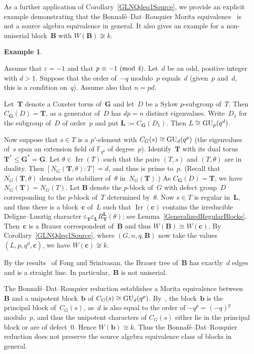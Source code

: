 \documentclass[12pt]{amsart}
\newcommand{\bG}{{\mathbf{G}}}      %
\newcommand{\bB}{{\mathbf{B}}}
\newcommand{\bL}{{\mathbf{L}}}
\newcommand{\bT}{{\mathbf{T}}}
\newcommand{\bb}{{\mathbf{b}}}
\newcommand{\bc}{{\mathbf{c}}}
\def\GU{ \text{\rm GU} }
\DeclareMathOperator{\Irr}{Irr}
\theoremstyle{theorem}
\theoremstyle{definition}
\newtheorem{exmp}[thm]{Example}
\theoremstyle{remark}
\begin{document}
As a further application of Corollary~\ref{GLNQdeq1Source}, we provide an
explicit example demonstrating that the Bonnaf{\'e}--Dat--Rouquier Morita 
equivalence~\cite{BoDaRo} is not a source algebra equivalence in general.
It also gives an example for a non-uniserial block~${\bB}$ with 
$W( {\bB} ) \not\cong k$.
\begin{exmp}
\label{BoDaRoExample}
{\rm
Assume that $\varepsilon = -1$ and that $p \equiv -1\,\,(\mbox{\rm mod}\,\,4)$.
Let~$d$ be an odd, positive integer with $d > 1$. Suppose that the order of~$-q$ 
modulo~$p$ equals~$d$ (given~$p$ and~$d$, this is a condition on~$q$). Assume 
also that $n = pd$.

Let~${\bT}$ denote a Coxeter torus of~${\bG}$ and let~${D}$ be a Sylow 
$p$-subgroup of~${T}$. Then $C_{{\bG}}( {D} ) = {\bT}$, as a generator of~$D$ 
has $dp = n$ distinct eigenvalues. Write~${D}_1$ for the subgroup of~${D}$ of 
order~$p$ and put ${\bL} := C_{{\bG}}( {D}_1 )$. Then ${L} \cong \GU_p( q^d )$.

Now suppose that $s \in {T}$ is a $p'$-element with $C_{{G}}( s ) 
\cong \GU_d( q^p )$ (the eigenvalues of~$s$ span an extension field of 
$\mathbb{F}_{q^2}$ of degree~$p$). Identify~$\bT$ with its dual torus 
$\bT^* \leq \bG^* = \bG$. Let $\theta \in \Irr( T )$ such that the pairs
$(T,s)$ and $(T, \theta)$ are in duality. Then 
$[N_{{G}}( {\bT}, \theta )\colon\!{T}] = d$, and thus is prime to~$p$.
(Recall that $N_{{G}}( {\bT}, \theta )$ denotes the stabilizer of~$\theta$
in~$N_G(\bT)$.) As $C_{\bG}( D ) = \bT$, we have $N_G( \bT )= N_G( T )$.
Let ${\bB}$ denote the $p$-block of~${G}$ with defect group~${D}$ 
corresponding to the $p$-block of~${T}$ determined by~$\theta$. Now 
$s \in {T}$ is regular in~${\bL}$, and thus there is a block~${\bc}$
of~${L}$ such that $\Irr({\bc})$ contains the irreducible 
Deligne--Lusztig character
$\varepsilon_{{\bT}}\varepsilon_{{\bL}} R_{{\bT}}^{{\bL}}( \theta )$;
see Lemma~\ref{GeneralizedRegularBlocks}.
Then~${\bc}$ is a Brauer correspondent of~${\bB}$ and thus
$W( {\bB} ) \cong W( {\bc} )$.
By Corollary~\ref{GLNQdeq1Source}, where $({G}, n, q, {\bB})$ now
take the values $({L}, p, q^d, {\bc})$, we have
$W( {\bc} ) \not\cong k$.

By the results~\cite{fongcl} of Fong and Srinivasan, the Brauer tree
of~${\bB}$ has exactly~$d$ edges and is a straight line. In
particular,~${\bB}$ is not uniserial.

The Bonnaf{\'e}--Dat--Rouquier reduction \cite{BoDaRo} establishes a Morita
equivalence between~${\bB}$ and a unipotent block~${\bb}$ of 
$C_{{G}}( s ) \cong \GU_d( q^p )$. By~\cite[Theorem (7A)]{fs2}, the 
block~${\bb}$ is the principal block of~$C_{{G}}( s )$, as~$d$ is 
also equal to the order of $-q^p = (-q)^p$ modulo~$p$, and thus the
unipotent characters of $C_{{G}}( s )$ either lie in the principal block or 
are of defect~$0$. Hence $W( {\bb} ) \cong k$. 
Thus the Bonnaf{\'e}--Dat--Rouquier reduction does not preserve the source 
algebra equivalence class of blocks in general.

}
\end{exmp}
\end{document}
